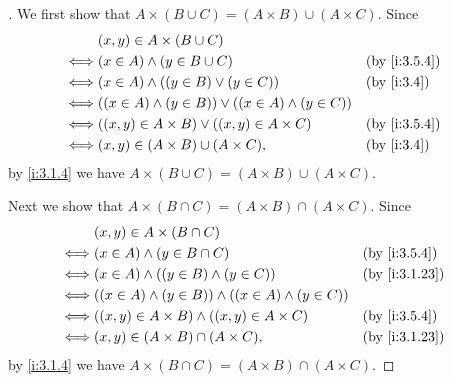 \begin{proof}[]
  We first show that \(A \times (B \cup C) = (A \times B) \cup (A \times C)\).
  Since
  \begin{align*}
         & (x, y) \in A \times (B \cup C)                                                 \\
    \iff & (x \in A) \land (y \in B \cup C)                             &  & \by{i:3.5.4} \\
    \iff & (x \in A) \land ((y \in B) \lor (y \in C))                   &  & \by{i:3.4}   \\
    \iff & ((x \in A) \land (y \in B)) \lor ((x \in A) \land (y \in C))                   \\
    \iff & ((x, y) \in A \times B) \lor ((x, y) \in A \times C)         &  & \by{i:3.5.4} \\
    \iff & (x, y) \in (A \times B) \cup (A \times C),                   &  & \by{i:3.4}
  \end{align*}
  by \cref{i:3.1.4} we have \(A \times (B \cup C) = (A \times B) \cup (A \times C)\).

  Next we show that \(A \times (B \cap C) = (A \times B) \cap (A \times C)\).
  Since
  \begin{align*}
         & (x, y) \in A \times (B \cap C)                                                   \\
    \iff & (x \in A) \land (y \in B \cap C)                              &  & \by{i:3.5.4}  \\
    \iff & (x \in A) \land ((y \in B) \land (y \in C))                   &  & \by{i:3.1.23} \\
    \iff & ((x \in A) \land (y \in B)) \land ((x \in A) \land (y \in C))                    \\
    \iff & ((x, y) \in A \times B) \land ((x, y) \in A \times C)         &  & \by{i:3.5.4}  \\
    \iff & (x, y) \in (A \times B) \cap (A \times C),                    &  & \by{i:3.1.23}
  \end{align*}
  by \cref{i:3.1.4} we have \(A \times (B \cap C) = (A \times B) \cap (A \times C)\).


\end{proof}
